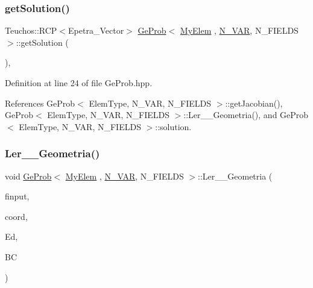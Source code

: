 \mbox{\label{classGeProb_ae29860923e40758aa1a7810556bb0f8e}} 
\subsubsection{\texorpdfstring{get\+Solution()}{getSolution()}}
{\footnotesize\ttfamily Teuchos\+::\+R\+CP$<$Epetra\+\_\+\+Vector$>$ \hyperlink{classGeProb}{Ge\+Prob}$<$ \hyperlink{DG__Prob_8h_a83cd887ced9a6587428f267e50cd4787}{My\+Elem} , \hyperlink{classED__Prob_a4e7d2ff1a8e435e336fb00c527224b5a}{N\+\_\+\+V\+AR}, N\+\_\+\+F\+I\+E\+L\+DS $>$\+::get\+Solution (\begin{DoxyParamCaption}{ }\end{DoxyParamCaption})\hspace{0.3cm}{\ttfamily [inline]}, {\ttfamily [inherited]}}



Definition at line 24 of file Ge\+Prob.\+hpp.



References Ge\+Prob$<$ Elem\+Type, N\+\_\+\+V\+A\+R, N\+\_\+\+F\+I\+E\+L\+D\+S $>$\+::get\+Jacobian(), Ge\+Prob$<$ Elem\+Type, N\+\_\+\+V\+A\+R, N\+\_\+\+F\+I\+E\+L\+D\+S $>$\+::\+Ler\+\_\+\+\_\+\+Geometria(), and Ge\+Prob$<$ Elem\+Type, N\+\_\+\+V\+A\+R, N\+\_\+\+F\+I\+E\+L\+D\+S $>$\+::solution.

\mbox{\label{classGeProb_a1b1545b917023458df409bd97573bac5}} 
\subsubsection{\texorpdfstring{Ler\+\_\+\+\_\+\+Geometria()}{Ler\_\_Geometria()}}
{\footnotesize\ttfamily void \hyperlink{classGeProb}{Ge\+Prob}$<$ \hyperlink{DG__Prob_8h_a83cd887ced9a6587428f267e50cd4787}{My\+Elem} , \hyperlink{classED__Prob_a4e7d2ff1a8e435e336fb00c527224b5a}{N\+\_\+\+V\+AR}, N\+\_\+\+F\+I\+E\+L\+DS $>$\+::Ler\+\_\+\+\_\+\+Geometria (\begin{DoxyParamCaption}\item[{F\+I\+LE $\ast$}]{finput,  }\item[{double $\ast$}]{coord,  }\item[{int $\ast$}]{Ed,  }\item[{int $\ast$}]{BC }\end{DoxyParamCaption})\hspace{0.3cm}{\ttfamily [inherited]}}



